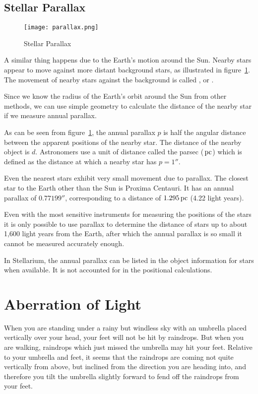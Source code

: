 \subsection{Stellar Parallax}
\label{sec:Concepts:StellarParallax}

\begin{figure}[tb]
\centering\texttt{[image: parallax.png]}
\caption{Stellar Parallax}
\label{fig:Parallax}
\end{figure}

A similar thing happens due to the Earth's motion around the Sun. Nearby
stars appear to move against more distant background stars, as
illustrated in figure~\ref{fig:Parallax}.
The movement of nearby stars against the background is called
, or .

Since we know the radius of the Earth's orbit around the
Sun from other methods, we can use simple geometry to calculate the
distance of the nearby star if we measure annual parallax.

As can be seen from figure~\ref{fig:Parallax}, the annual
parallax $p$ is half the angular distance between the apparent positions
of the nearby star. The distance of the nearby object is $d$. Astronomers
use a unit of distance called the parsec ($\,\mathrm{pc}$) which is defined as the
distance at which a nearby star has $p=1''$.

Even the nearest stars exhibit very small movement due to
parallax. The closest star to the Earth other than the Sun is Proxima
Centauri. It has an annual parallax of $0.77199''$, corresponding to a
distance of $1.295\,\mathrm{pc}$ (4.22 light years).

Even with the most sensitive instruments for measuring the positions of
the stars it is only possible to use parallax to determine the distance
of stars up to about 1,600 light years from the Earth, after which the
annual parallax is so small it cannot be measured accurately enough.

In Stellarium, the annual parallax can be listed in the object information for stars
when available. It is not accounted for in the positional calculations.

\section{Aberration of Light}
\label{sec:Concepts:Aberration}

 When you are standing under a rainy but
windless sky with an umbrella placed vertically over your head, your
feet will not be hit by raindrops. But when you are walking, raindrops
which just missed the umbrella may hit your feet. Relative to your
umbrella and feet, it seems that the raindrops are coming not quite
vertically from above, but inclined from the direction you are heading
into, and therefore you tilt the umbrella slightly forward to fend off
the raindrops from your feet.

